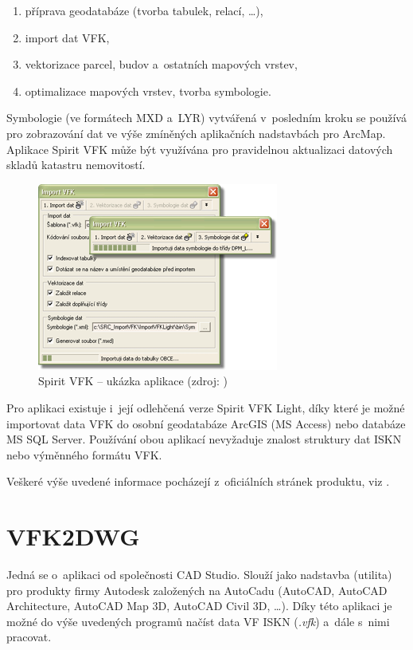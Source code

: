 \documentclass[a4paper,12pt,oneside]{book}
\begin{document}
\begin{enumerate}
 \item příprava geodatabáze (tvorba tabulek, relací, \dots),
 \item import dat VFK,
 \item vektorizace parcel, budov a~ostatních mapových vrstev,
 \item optimalizace mapových vrstev, tvorba symbologie.
\end{enumerate}

Symbologie (ve formátech MXD a~LYR) vytvářená v~posledním kroku se používá pro zobrazování dat ve výše zmíněných aplikačních nadstavbách pro ArcMap. Aplikace Spirit VFK může být využívána pro pravidelnou aktualizaci datových skladů katastru nemovitostí.

\begin{figure}[htb]
\centering
\includegraphics[scale=0.9]{images/spirit_vfk.png}
\caption[Spirit VFK -- ukázka aplikace]{Spirit VFK -- ukázka aplikace (zdroj: \cite{spirit_vfk})}
\end{figure}

Pro aplikaci existuje i~její odlehčená verze Spirit VFK Light, díky které je možné importovat data VFK do osobní geodatabáze ArcGIS (MS Access) nebo databáze MS SQL Server. Používání obou aplikací nevyžaduje znalost struktury dat ISKN nebo výměnného formátu VFK.

Veškeré výše uvedené informace pocházejí z~oficiálních stránek produktu, viz \cite{spirit_vfk}.

\section{VFK2DWG}
\label{l_vfk2dwg}
Jedná se o~aplikaci od společnosti CAD Studio. Slouží jako nadstavba (utilita) pro produkty firmy Autodesk založených na AutoCadu (AutoCAD, AutoCAD Architecture, AutoCAD Map 3D, AutoCAD Civil 3D, \dots). Díky této aplikaci je možné do výše uvedených programů načíst data VF ISKN (\textit{.vfk}) a~dále s~nimi pracovat.
\end{document}
